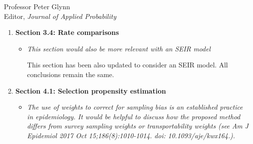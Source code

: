 \documentclass[11pt]{letter} %
\begin{document}
\begin{letter}{Professor
	Peter Glynn\\
	Editor, {\em Journal of Applied Probability}}
\begin{enumerate}
\begin{itemize}
	\noindent Heng and Althaus (2020) derive the following approximate formula for the basic reproduction number under SEIR dynamics:
	$$
	R_0 = \frac{1 + \Lambda \left(\frac{1}{\sigma} + \frac{1}{\gamma} \right)}{S_0 + I_0 (1 + \gamma/\sigma)}.
	$$
	where~$\Lambda$ is the epidemic growth rate, and $S_0$/$I_0$ are the initial fractions of the population that are susceptible and infectious respectively.  For $S_0 \approx 1$ and $I_0 \ll 1$, we have the approximate realtionship $R_0 \approx 1 + (\frac{1}{\gamma} + \frac{1}{\sigma})\Lambda$.
	, this is an approximate solution which lacks the term $\Lambda^2 \frac{1}{\gamma \sigma}$.  ``It corresponds to the case of an exponentially distributed generation time with mean duration $1/\gamma + 1/\sigma$, which is the same as the solution for the SIR model assuming an infectious period of $1/\gamma + 1/\sigma$. For realistic growth rates and choices of $\sigma$ and $\gamma$ for the COVID-19 pandemic, this term is negligible and therefore we work with the approximate formula.
	\vspace{5mm}

	\noindent Using the connection to the SIR model with infectious period $1/\gamma + 1/\sigma$, and replacing the true epidemic growth rate~$\Lambda$ by the estimated growth rate~$\hat \Lambda = \log \left( K_t / K_{t-1} \right)$ yields our new moment-based estimator. The updated $R_t$ estimator shows that the same intuition about the error holds when we are considering an SEIR rather than an SIR model.  Figure XX shows the reproduction number estimates and potential biases under SEIR dynamics which shows the same general conclusions hold.
\end{itemize}
\item {\bf Section 3.4: Rate comparisons}
\begin{itemize}
	\item {\it This section would also be more relevant with an SEIR model}
	\vspace{5mm}

	This section has been also updated to consider an SEIR model.  All conclusions remain the same.
	\vspace{5mm}
\end{itemize}
\item {\bf Section 4.1: Selection propensity estimation}
\begin{itemize}
	\item {\it The use of weights to correct for sampling bias is an established practice in epidemiology. It would be helpful to discuss how the proposed method differs from survey sampling weights or transportability weights (see Am J Epidemiol 2017 Oct 15;186(8):1010-1014. doi: 10.1093/aje/kwx164.).}
	\vspace{5mm}


\end{itemize}
\end{enumerate}
\end{letter}
\end{document}
